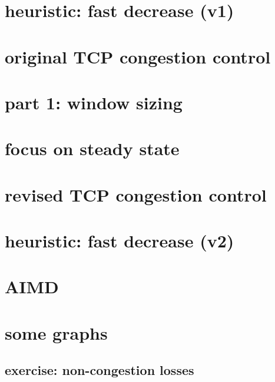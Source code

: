 \section{heuristic: fast decrease (v1)}


\section{original TCP congestion control}


\section{part 1: window sizing}

\section{focus on steady state}


\section{revised TCP congestion control}


\section{heuristic: fast decrease (v2)}


\section{AIMD}



\section{some graphs}



\subsection{exercise: non-congestion losses} %






